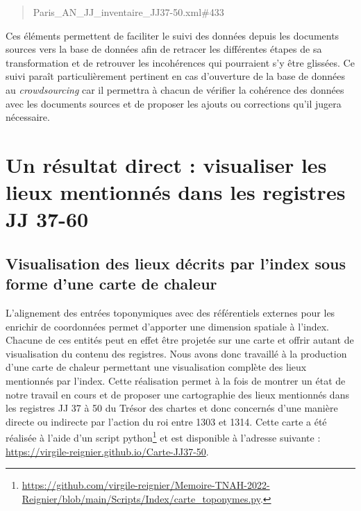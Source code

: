 \documentclass[a4paper,12pt,twoside]{book}
\begin{document}
	\begin{quotation}
		Paris\_AN\_JJ\_inventaire\_JJ37-50.xml\#433
	\end{quotation}
	
	\noindent Ces éléments permettent de faciliter le suivi des données depuis les documents sources vers la base de données afin de retracer les différentes étapes de sa transformation et de retrouver les incohérences qui pourraient s'y être glissées. Ce suivi paraît particulièrement pertinent en cas d'ouverture de la base de données au \textit{crowdsourcing} car il permettra à chacun de vérifier la cohérence des données avec les documents sources et de proposer les ajouts ou corrections qu'il jugera nécessaire.
	
	\section{Un résultat direct : visualiser les lieux mentionnés dans les registres JJ 37-60}
	
	\subsection{Visualisation des lieux décrits par l'index sous forme d'une carte de chaleur}
	
	L'alignement des entrées toponymiques avec des référentiels externes pour les enrichir de coordonnées permet d'apporter une dimension spatiale à l'index. Chacune de ces entités peut en effet être projetée sur une carte et offrir autant de visualisation du contenu des registres. Nous avons donc travaillé à la production d'une carte de chaleur permettant une visualisation complète des lieux mentionnés par l'index. Cette réalisation permet à la fois de montrer un état de notre travail en cours et de proposer une cartographie des lieux mentionnés dans les registres JJ 37 à 50 du Trésor des chartes et donc concernés d'une manière directe ou indirecte par l'action du roi entre 1303 et 1314. Cette carte a été réalisée à l'aide d'un script python\footnote{\url{https://github.com/virgile-reignier/Memoire-TNAH-2022-Reignier/blob/main/Scripts/Index/carte_toponymes.py}.} et est disponible à l'adresse suivante : \url{https://virgile-reignier.github.io/Carte-JJ37-50}.
	
\end{document}
